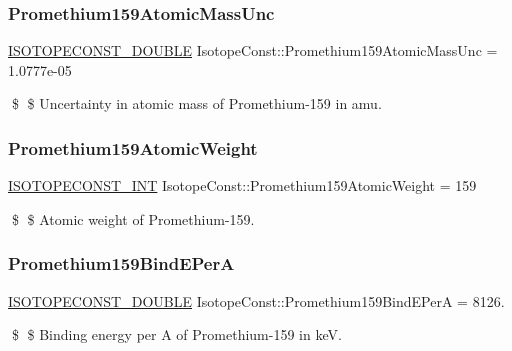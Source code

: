\subsubsection{\texorpdfstring{Promethium159\+Atomic\+Mass\+Unc}{Promethium159AtomicMassUnc}}
{\footnotesize\ttfamily \mbox{\hyperlink{group___isotope_const-_macros_ga8f45a7272ce02c0b4c65c44636ed719a}{I\+S\+O\+T\+O\+P\+E\+C\+O\+N\+S\+T\+\_\+\+D\+O\+U\+B\+LE}} Isotope\+Const\+::\+Promethium159\+Atomic\+Mass\+Unc = 1.\+0777e-\/05}

\$ \$ Uncertainty in atomic mass of Promethium-\/159 in amu. \mbox{\label{group___isotope_const-_promethium-_pm159_ga02a81af232c0c63993896d05eb91ce6d}} 
\subsubsection{\texorpdfstring{Promethium159\+Atomic\+Weight}{Promethium159AtomicWeight}}
{\footnotesize\ttfamily \mbox{\hyperlink{group___isotope_const-_macros_ga5f18360b3e99483a35c32d789e62621c}{I\+S\+O\+T\+O\+P\+E\+C\+O\+N\+S\+T\+\_\+\+I\+NT}} Isotope\+Const\+::\+Promethium159\+Atomic\+Weight = 159}

\$ \$ Atomic weight of Promethium-\/159. \mbox{\label{group___isotope_const-_promethium-_pm159_ga5de9a44bc2d2268b2b417fabdf8dcc10}} 
\subsubsection{\texorpdfstring{Promethium159\+Bind\+E\+PerA}{Promethium159BindEPerA}}
{\footnotesize\ttfamily \mbox{\hyperlink{group___isotope_const-_macros_ga8f45a7272ce02c0b4c65c44636ed719a}{I\+S\+O\+T\+O\+P\+E\+C\+O\+N\+S\+T\+\_\+\+D\+O\+U\+B\+LE}} Isotope\+Const\+::\+Promethium159\+Bind\+E\+PerA = 8126.}

\$ \$ Binding energy per A of Promethium-\/159 in keV. \mbox{\label{group___isotope_const-_promethium-_pm159_ga9275c949b1fd96ad3946774126b9b16b}} 
